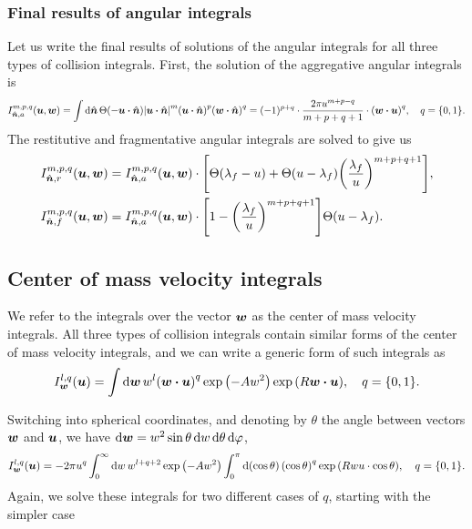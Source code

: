 \documentclass[aps,prl,preprint,groupedaddress,10pt]{revtex4-2}
\begin{document}
\subsubsection{Final results of angular integrals}
Let us write the final results of solutions of the angular integrals for all three types
of collision integrals. First, the solution of the aggregative angular integrals is
\begin{equation}
    I_{\bn,a}^{m,p,q}(\bu,\bw)=\int\dd{\bn}\Theta\pqty{-\bu\vdot\bn}
    \abs{\bu\vdot\bn}^m\pqty{\bu\vdot\bn}^p\pqty{\bw\vdot\bn}^q=
    (-1)^{p+q}\cdot\frac{2\pi u^{m+p-q}}{m+p+q+1}
    \cdot\pqty{\bw\vdot\bu}^{q},\quad q=\Bqty{0,1}.
\end{equation}
The restitutive and fragmentative angular integrals are solved to give us
\begin{equation}
    \begin{split}
        I_{\bn,r}^{m,p,q}(\bu,\bw)&=I_{\bn,a}^{m,p,q}(\bu,\bw)\cdot
        \bqty{\Theta\pqty{\lambda_f-u}+\Theta\pqty{u-\lambda_f}
            \pqty{\frac{\lambda_f}{u}}^{m+p+q+1}},\\
        I_{\bn,f}^{m,p,q}(\bu,\bw)&=I_{\bn,a}^{m,p,q}(\bu,\bw)\cdot
        \bqty{1-\pqty{\frac{\lambda_f}{u}}^{m+p+q+1}}
        \Theta\pqty{u-\lambda_f}.
    \end{split}
\end{equation}

\subsection{Center of mass velocity integrals}
We refer to the integrals over the vector $\vb*{w}$ as the center of mass velocity
integrals. All three types of collision integrals contain similar forms of the
center of mass velocity integrals, and we can write a generic form of such integrals
as
\begin{equation}
    I_{\bw}^{l,q}(\bu)=\int\dd{\bw}w^{l}\pqty{\bw\vdot\bu}^q\exp\pqty{-Aw^2}
    \exp\pqty{R\bw\vdot\bu},\quad q=\Bqty{0,1}.
\end{equation}

Switching into spherical coordinates, and denoting by $\theta$ the angle between vectors
$\vb*{w}$ and $\vb*{u}$, we have $\dd{\vb*{w}}=w^2\sin\theta\dd{w}\dd{\theta}\dd{\varphi}$,
\begin{equation}
    I_{\bw}^{l,q}(\bu)=-2\pi u^q\int_0^{\infty}\dd{w}w^{l+q+2}\exp\pqty{-Aw^2}
    \int_0^{\pi}\dd{\pqty{\cos\theta}}\pqty{\cos\theta}^q\exp\pqty{Rwu\cdot\cos\theta},
    \quad q=\Bqty{0,1}.
\end{equation}
Again, we solve these integrals for two different cases of $q$, starting with the
simpler case
\end{document}
